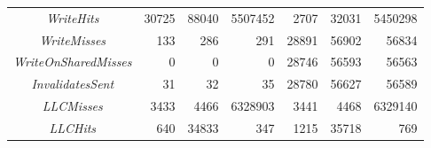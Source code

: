 \begin{table}[h]
\begin{adjustwidth}{-2cm}{-2cm}
\begin{center}
\begin{tabular}{| c | r r r | r r r|}
				\textit{WriteHits} & 30725 & 88040 & 5507452 & 2707 & 32031 & 5450298 \\
				\textit{WriteMisses} & 133 & 286 & 291 & 28891 & 56902 & 56834 \\
				\textit{WriteOnSharedMisses} & 0 & 0 & 0 & 28746 & 56593 & 56563 \\
				\textit{InvalidatesSent} & 31 & 32 & 35 & 28780 & 56627 & 56589 \\
				\textit{LLCMisses} & 3433 & 4466 & 6328903 & 3441 & 4468 & 6329140 \\
				\textit{LLCHits} & 640 & 34833 & 347 & 1215 & 35718 & 769\\
				\hline
			\end{tabular}
		\end{center}
	\end{adjustwidth}
\end{table}